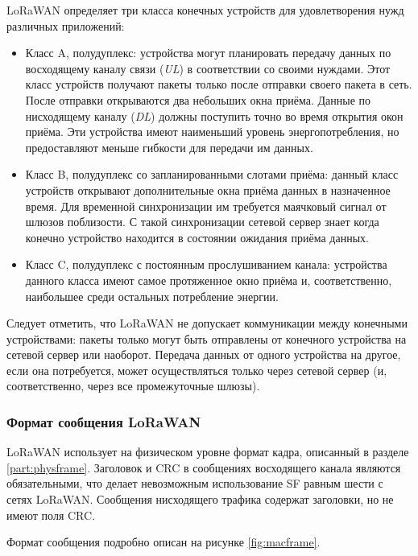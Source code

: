 LoRaWAN определяет три класса конечных устройств для удовлетворения нужд различных приложений:
\begin{itemize}
 \item Класс A, полудуплекс: устройства могут планировать передачу данных по восходящему каналу связи (\textit{UL}) в соответствии со своими нуждами. Этот класс устройств получают пакеты только после отправки своего пакета в сеть. После отправки открываются два небольших окна приёма. Данные по нисходящему каналу (\textit{DL}) должны поступить точно во время открытия окон приёма. Эти устройства имеют наименьший уровень энергопотребления, но предоставляют меньше гибкости для передачи им данных.
 \item Класс B, полудуплекс со запланированными слотами приёма: данный класс устройств открывают дополнительные окна приёма данных в назначенное время. Для временной синхронизации им требуется маячковый сигнал от шлюзов поблизости. С такой синхронизации сетевой сервер знает когда конечно устройство находится в состоянии ожидания приёма данных.
 \item Класс C, полудуплекс с постоянным прослушиванием канала: устройства данного класса имеют самое протяженное окно приёма и, соответственно, наибольшее среди остальных потребление энергии.
\end{itemize}

Следует отметить, что LoRaWAN не допускает коммуникации между конечными устройствами: пакеты только могут быть отправлены от конечного устройства на сетевой сервер или наоборот. 
Передача данных от одного устройства на другое, если она потребуется, может осуществляться только через сетевой сервер (и, соответственно, через все промежуточные шлюзы).

\subsubsection{Формат сообщения LoRaWAN} 

LoRaWAN использует на физическом уровне формат кадра, описанный в разделе \ref{part:physframe}.
Заголовок и CRC в сообщениях восходящего канала являются обязательными, что делает невозможным использование SF равным шести с сетях LoRaWAN.
Сообщения нисходящего трафика содержат заголовки, но не имеют поля CRC.

Формат сообщения подробно описан на рисунке \ref{fig:macframe}.

